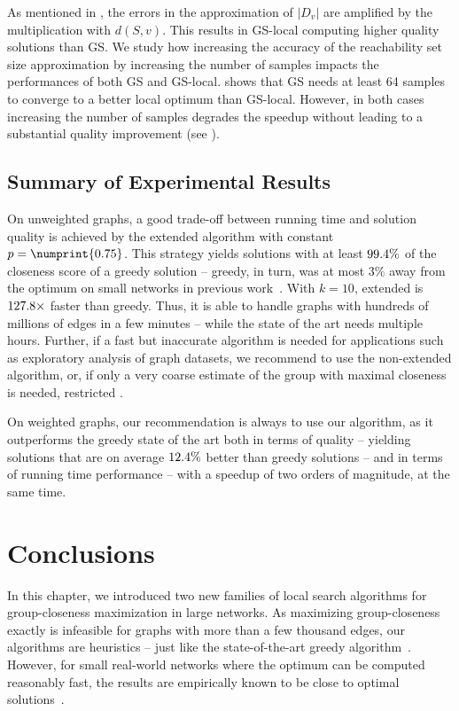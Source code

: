 As mentioned in , the errors in the approximation of $|D_v|$ are
amplified by the multiplication with $d(S, v)$. This results in GS-local computing
higher quality solutions than GS. We study how increasing the accuracy of the reachability
set size approximation by increasing the number of samples impacts the performances
of both GS and GS-local.
 shows that GS needs at least 64 samples to
converge to a better local optimum than GS-local. However, in both cases increasing the
number of samples degrades the speedup without leading to a substantial quality
improvement (see ).

\subsection{Summary of Experimental Results}
%
On unweighted graphs, a good trade-off between running time and solution quality is achieved
by the extended \growshrink algorithm with constant $p = \numprint{0.75}$.
This strategy yields solutions with at least $\onedigit{\gsPSevenFiveKQualNum}\%$
of the closeness score of a greedy solution -- greedy, in turn, was at most $3\%$ away from
the optimum on small networks in previous work~\cite{DBLP:conf/alenex/BergaminiGM18}.
%
With $k = 10$, extended \growshrink is $\onedigit{\gsPSevenFiveKSpeed}\times$
faster than greedy. Thus, it is able to handle graphs with hundreds of millions of edges
in a few minutes -- while the state of the art needs multiple hours.
%
Further, if a fast but inaccurate algorithm is needed for applications such as exploratory
analysis of graph datasets, we recommend to use the non-extended \growshrink algorithm, or,
if only a very coarse estimate of the group with maximal closeness is needed, restricted
\localswaps.

On weighted graphs, our recommendation is always to use our \growshrink algorithm, as it
outperforms the greedy state of the art both in terms of quality -- yielding solutions
that are on average $\onedigit{\wGSQualInc}\%$ better than greedy solutions --
and in terms of running time performance -- with a speedup of two orders of magnitude,
at the same time.

\section{Conclusions}
%
In this chapter, we introduced two new families of
local search algorithms for group-closeness maximization in large networks.
As maximizing group-closeness exactly is infeasible for graphs with more than
a few thousand edges, our algorithms are heuristics -- just like the state-of-the-art
greedy algorithm~\cite{DBLP:conf/alenex/BergaminiGM18}. However, for small
real-world networks where the optimum can be computed reasonably fast, the
results are empirically known to be close to optimal
solutions~\cite{DBLP:conf/alenex/BergaminiGM18}.

